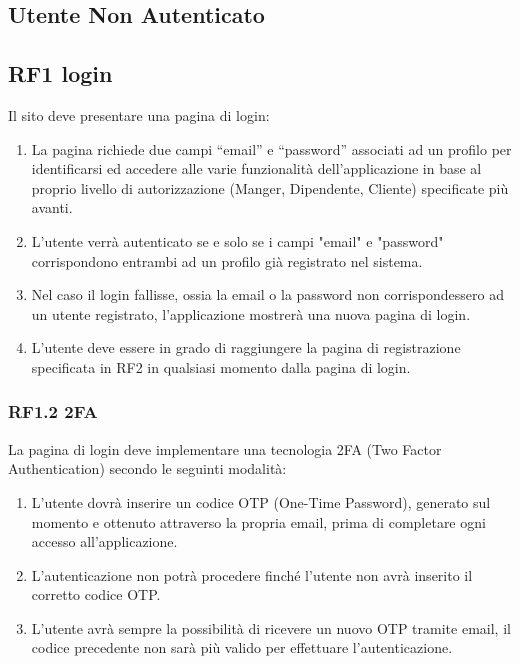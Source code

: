 \documentclass{report}
\begin{document}
\subsection{Utente Non Autenticato}

\subsection*{RF1 login}
Il sito deve presentare una pagina di login:
\begin{enumerate}
	\item La pagina richiede due campi “email” e “password” associati ad un profilo per identificarsi ed accedere alle varie funzionalità dell’applicazione in base al proprio livello di autorizzazione (Manger, Dipendente, Cliente) specificate più avanti.
	
	\item L'utente verrà autenticato se e solo se i campi "email" e "password" corrispondono entrambi ad un profilo già registrato nel sistema.
	
	\item Nel caso il login fallisse, ossia la email o la password non corrispondessero ad un utente registrato, l’applicazione mostrerà una nuova pagina di login.
	
	\item L’utente deve essere in grado di raggiungere la pagina di registrazione specificata in RF2 in qualsiasi momento dalla pagina di login.
	
\end{enumerate}

	\subsubsection{RF1.2 2FA}
	La pagina di login deve implementare una tecnologia 2FA (Two Factor Authentication) secondo le seguinti modalità:
	
	\begin{enumerate}
	\item L’utente dovrà inserire un codice OTP (One-Time Password), generato sul momento e ottenuto attraverso la propria email, prima di completare ogni accesso all’applicazione. 
	
	\item 	L’autenticazione non potrà procedere finché l’utente non avrà inserito il corretto codice OTP.
	
	\item L’utente avrà sempre la possibilità di ricevere un nuovo OTP tramite email, il codice precedente non sarà più valido per effettuare l’autenticazione.

	\end{enumerate}
	
\end{document}
